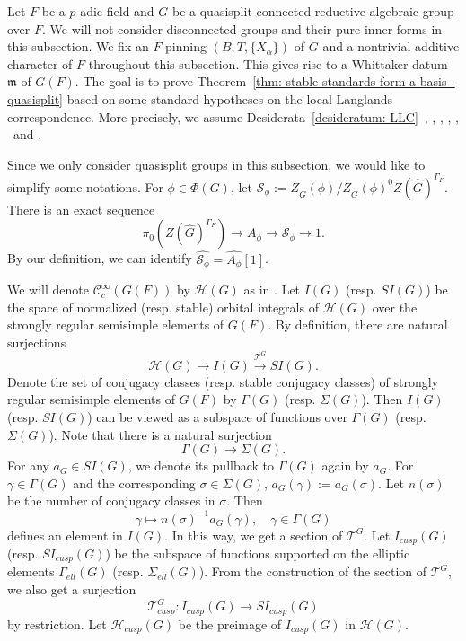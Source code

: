 \documentclass[11pt,letterpaper]{amsart}
\numberwithin{equation}{section}
\begin{document}
Let $F$ be a $p$-adic field and $G$ be a quasisplit connected reductive algebraic group over $F$. We will not consider disconnected groups and their pure inner forms in this subsection. We fix an $F$-pinning $(B, T, \{X_{\alpha}\})$ of $G$ and a nontrivial additive character of $F$ throughout this subsection. This gives rise to a Whittaker datum $\mathfrak{m}$ of $G(F)$. The goal is to prove Theorem~\ref{thm: stable standards form a basis - quasisplit} based on some standard hypotheses on the local Langlands correspondence. More precisely,  we assume Desiderata~\ref{desideratum: LLC}\  \Sta, \LC, \CTD, \CCh, \ECR, \TI\ and \Hai.



Since we only consider quasisplit groups in this subsection, we would like to simplify some notations. For $\phi \in \Phi(G)$, let $\mathcal{S}_{\phi} := Z_{\widehat{G}}(\phi)/Z_{\widehat{G}}(\phi)^{0}Z(\widehat{G})^{\Gamma_{F}}$. There is an exact sequence
\[
 \pi_0(Z(\widehat{G})^{\Gamma_F}) \rightarrow A_{\phi} \rightarrow \mathcal{S}_{\phi} \rightarrow 1.
\]
By our definition, we can identify $\widehat{\mathcal{S}_{\phi}} = \widehat{A_{\phi}}[1]$.




We will denote $\mathcal{C}^{\infty}_c(G(F))$ by $\mathcal{H}(G)$ as in \cite{Art96}. Let $I(G)$ (resp. $SI(G)$) be the space of normalized (resp. stable) orbital integrals of $\mathcal{H}(G)$ over the strongly regular semisimple elements of $G(F)$. By definition, there are natural surjections 
\[
\mathcal{H}(G) \rightarrow I(G) \xrightarrow{\mathcal{T}^G} SI(G).
\]
Denote the set of conjugacy classes (resp. stable conjugacy classes) of strongly regular semisimple elements of $G(F)$ by $\Gamma(G)$ (resp. $\Sigma(G)$). Then $I(G)$ (resp. $SI(G)$) can be viewed as a subspace of functions over $\Gamma(G)$ (resp. $\Sigma(G)$). Note that there is a natural surjection
\[
\Gamma(G) \rightarrow \Sigma(G).
\]
For any $a_{G} \in SI(G)$, we denote its pullback to $\Gamma(G)$ again by $a_{G}$. For $\gamma \in \Gamma(G)$ and the corresponding $\sigma \in \Sigma(G)$, $a_{G}(\gamma) := a_{G}(\sigma)$. Let $n(\sigma)$ be the number of conjugacy classes in $\sigma$. Then 
\[
\gamma \mapsto n(\sigma)^{-1}a_{G}(\gamma), \quad \gamma \in \Gamma(G)
\]
defines an element in $I(G)$. In this way, we get a section of $\mathcal{T}^{G}$. Let $I_{cusp}(G)$ (resp. $SI_{cusp}(G)$) be the subspace of functions supported on the elliptic elements $\Gamma_{ell}(G)$ (resp. $\Sigma_{ell}(G)$). From the construction of the section of $\mathcal{T}^{G}$, we also get a surjection
\[
\mathcal{T}^{G}_{cusp}: I_{cusp}(G) \rightarrow SI_{cusp}(G)
\]
by restriction. Let $\mathcal{H}_{cusp}(G)$ be the preimage of $I_{cusp}(G)$ in $\mathcal{H}(G)$.
\end{document}
